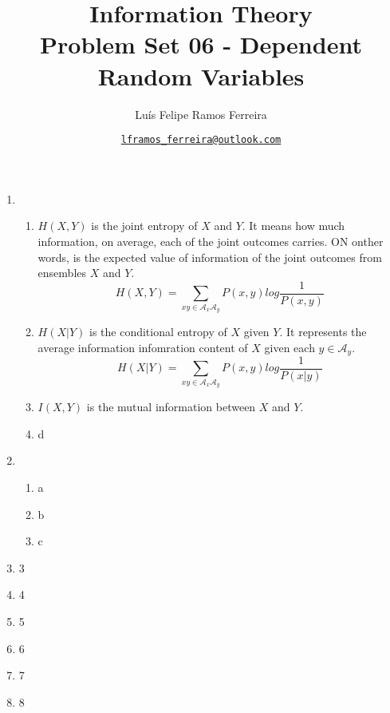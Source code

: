 \documentclass{article}
\title{Information Theory \\ \large Problem Set 06 - Dependent Random Variables}
\author{Luís Felipe Ramos Ferreira}
\date{\href{mailto:lframos\_ferreira@outlook.com}{\texttt{lframos\_ferreira@outlook.com}}
}
\begin{document}
\maketitle

\begin{enumerate}
	\item \begin{enumerate}
		      \item \(H(X, Y)\) is the joint entropy of \(X\) and \(Y\). It means how much information, on average, each of the joint outcomes carries. ON onther words, is the expected value of information of the joint outcomes from ensembles \(X\) and \(Y\).
		            \[H(X, Y) = \sum_{xy \in \mathcal{A}_x\mathcal{A}_y} P(x, y) log \frac{1}{P(x, y)}\]
		      \item \(H(X | Y)\) is the conditional entropy of \(X\) given \(Y\). It represents the average information infomration content of \(X\) given each \(y \in \mathcal{A}_y\).
		            \[H(X | Y) = \sum_{xy \in \mathcal{A}_x\mathcal{A}_y} P(x, y) log \frac{1}{P(x | y)}\]
		      \item \(I(X, Y)\) is the mutual information between \(X\) and \(Y\).
		      \item d
	      \end{enumerate}

	\item \begin{enumerate}
		      \item a
		      \item b
		      \item c
	      \end{enumerate}

	\item 3
	\item 4
	\item 5
	\item 6
	\item 7
	\item 8
\end{enumerate}
\end{document}
